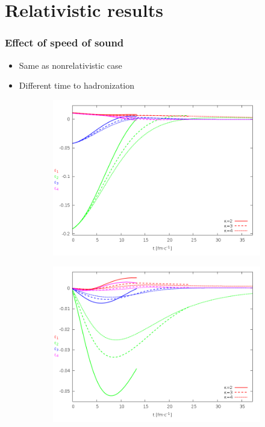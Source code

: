 \documentclass{beamer}
\begin{document}
\section{Relativistic results}
\begin{frame}
\frametitle{Effect of speed of sound}
\begin{center}
\begin{itemize}
\item Same as nonrelativistic case
\item Different time to hadronization
\end{itemize}
\begin{figure}[H]
	\centering
    \begin{subfigure}[b]{0.49\textwidth}
    		\includegraphics[width=\textwidth]{pic/res/rel/eps_kappa_n}
	\end{subfigure}
	\begin{subfigure}[b]{0.49\textwidth}
        	\includegraphics[width=\textwidth]{pic/res/rel/eps_kappa_v}
	\end{subfigure}
\end{figure}
\end{center}
\end{frame}
\end{document}
